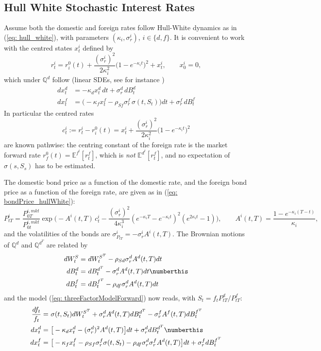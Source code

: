 \subsection{Hull White Stochastic Interest Rates}\label{subsec: HW3F}
Assume both the domestic and foreign rates follow Hull-White dynamics as in (\ref{eq: hull_white}), with parameters $(\kappa_i,\sigma^i_r)$, $i\in \{d,f\}$. It is convenient to work with the centred states $x^i_t$ defined by
\begin{equation}\label{eq: centredStates}
r^i_t=r^0_i(t)+\frac{(\sigma^i_r)^2}{2\kappa_i^2}\big(1-e^{-\kappa_it}\big)^2+x^i_t,\qquad x^i_0=0,
\end{equation}
which under $\mathbb{Q}^d$ follow (linear SDEs, see for instance \cite{bruti})
\begin{align*}
dx^d_t&=-\kappa_dx^d_t\,dt+\sigma^d_r\,dB^d_t\\
dx^f_t&=\big(-\kappa_fx^f_t-\rho_{Sf}\sigma^f_r\,\sigma(t,S_t)\big)dt+\sigma^f_r\,dB^f_t
\end{align*}
In particular the centred rates
$$ c^i_t:=r^i_t-r^0_i(t)=x^i_t+\frac{(\sigma^i_r)^2}{2\kappa_i^2}\big(1-e^{-\kappa_it}\big)^2 $$
are known pathwise: the centring constant of the foreign rate is the market forward rate $r^0_f(t)=\mathbb{E}^{f^t}[r^f_t]$, which is \emph{not} $\mathbb{E}^{d^t}[r^f_t]$, and no expectation of $\sigma(s,S_s)$ has to be estimated.

The domestic bond price as a function of the domestic rate, and the foreign bond price as a function of the foreign rate, are given as in (\ref{eq: bondPrice_hullWhite}):
$$ P^i_{tT}= \frac{P_{0T}^{i,mkt}}{P_{0t}^{i,mkt}}\exp\bigg( -A^i(t,T)\,c^i_t-\frac{(\sigma^i_r)^2}{4\kappa_i^3}(e^{-\kappa_i T}-e^{-\kappa_i t})^2(e^{2\kappa_i t}-1) \bigg),\qquad A^i(t,T) = \frac{1-e^{ -\kappa_i(T-t) }}{\kappa_i}, $$
and the volatilities of the bonds are $\sigma_{P_{tT}}^i=-\sigma^i_r A^i(t,T)$. The Brownian motions of $\mathbb{Q}^d$ and $\mathbb{Q}^{d^T}$ are related by
\begin{align*}
dW^{S}_t = &\ dW^{S^T}_t - \rho_{Sd}\sigma^d_r A^d(t,T)dt \\
dB^{d}_t = &\ dB^{d^T}_t - \sigma^d_r A^d(t,T)dt  \numberthis \label{measureChange: domesticForwardToDomestic}\\
dB^{f}_t = &\ dB^{f^T}_t - \rho_{df}\sigma^d_r A^d(t,T)dt
\end{align*}
and the model (\ref{eq: threeFactorModelForward}) now reads, with $S_t=f_tP^d_{tT}/P^f_{tT}$:
\begin{align*}
 \frac{df_t}{f_t}   = &\ \sigma(t,S_t)dW^{S^T}_t + \sigma^d_r A^d(t,T) dB_t^{d^T} - \sigma^f_r A^f(t,T) dB_t^{f^T} \\
 dx_t^d  = &\  \big[-\kappa_dx^d_t - (\sigma^d_r)^2 A^d(t,T)\big]dt + \sigma^d_r dB_t^{d^T} \numberthis \label{eq: threeFactorModelForwardHullWhite}\\
 dx_t^f  = & \ \big[-\kappa_fx^f_t - \rho_{Sf}\sigma^f_r\sigma(t,S_t) - \rho_{df}\sigma^d_r\sigma^f_rA^d(t,T) \big]dt + \sigma^f_r dB_t^{f^T}
\end{align*}

